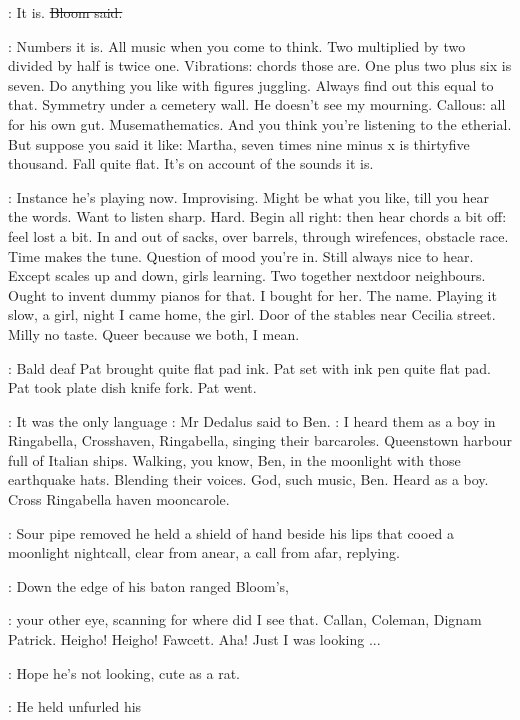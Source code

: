\Bloom:
It is.
\sout{Bloom said.}

\BloomInt:
Numbers it is.
All music when you come to think.
Two multiplied by two
divided by half is twice one.
Vibrations:
chords those are.
One plus two
plus six is seven.
Do anything you like with figures juggling.
Always find
out this equal to that.
Symmetry under a cemetery wall.
He doesn't see my
mourning.
Callous:
all for his own gut.
Musemathematics.
And you think
you're listening to the etherial.
But suppose you said it like:
Martha,
seven times nine minus x is thirtyfive thousand.
Fall quite flat.
It's on
account of the sounds it is.

\BloomInt:
Instance he's playing now.
Improvising.
Might be what you like,
till
you hear the words.
Want to listen sharp.
Hard.
Begin all right:
then hear
chords a bit off:
feel lost a bit.
In and out of sacks,
over barrels,
through wirefences,
obstacle race.
Time makes the tune.
Question of mood
you're in.
Still always nice to hear.
Except scales up and down,
girls
learning.
Two together nextdoor neighbours.
Ought to invent dummy pianos
for that.
I bought for her.
The name.
Playing it slow,
a girl,
night I came home,
the girl.
Door of the stables near Cecilia street.
Milly no taste.
Queer because we both,
I mean.

:
Bald deaf Pat brought quite flat pad ink.
Pat set with ink pen quite
flat pad.
Pat took plate dish knife fork.
Pat went.

\simon:
It was the only language
:
Mr Dedalus said to Ben.
\simon:
I heard them as a
boy in Ringabella,
Crosshaven,
Ringabella,
singing their barcaroles.
Queenstown harbour full of Italian ships.
Walking,
you know,
Ben,
in the
moonlight with those earthquake hats.
Blending their voices.
God,
such
music,
Ben.
Heard as a boy.
Cross Ringabella haven mooncarole.

:
Sour pipe removed he held a shield of hand beside his lips that cooed
a moonlight nightcall,
clear from anear,
a call from afar,
replying.

:
Down the edge of his  baton ranged Bloom's,

\BloomInt:
your other eye,
scanning for where did I see that.
Callan,
Coleman,
Dignam Patrick.
Heigho!
Heigho!
Fawcett.
Aha!
Just I was looking ...

\BloomInt:
Hope he's not looking,
cute as a rat.

:
He held unfurled his 

